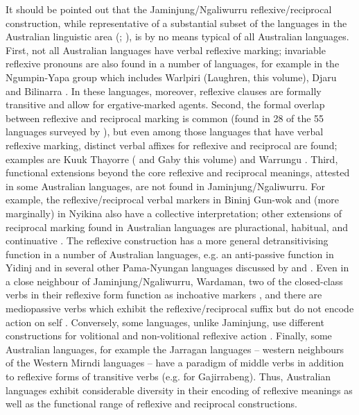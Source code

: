 \documentclass[output=paper,colorlinks,citecolor=brown]{langscibook}
\begin{document}
It should be pointed out that the Jaminjung/Ngaliwurru reflexive/reciprocal construction, while representative of a substantial subset of the languages in the Australian linguistic area (\citealt[320--321]{Dixon2002}; \citealt{Gabyinpress}), is by no means typical of all Australian languages. First, not all Australian languages have verbal reflexive marking; invariable reflexive pronouns are also found in a number of languages, for example in the Ngumpin-Yapa group which includes Warlpiri (Laughren, this volume), Djaru \citep{Tsunoda2007} and Bilinarra \citep[235--238]{MeakinsNordlinger2013}. In these languages, moreover, reflexive clauses are formally transitive and allow for ergative-marked agents. Second, the formal overlap between reflexive and reciprocal marking is common (found in 28 of the 55 languages surveyed by \citealt{Gabyinpress}), but even among those languages that have verbal reflexive marking, distinct verbal affixes for reflexive and reciprocal are found; examples are Kuuk Thayorre (\citealt{Gaby2008} and Gaby this volume) and Warrungu \citep{Tsunoda2007}. Third, functional extensions beyond the core reflexive and reciprocal meanings, attested in some Australian languages, are not found in Jaminjung/Ngaliwurru. For example, the reflexive/reciprocal verbal markers in Bininj Gun-wok \citep[495--497]{Evans2003} and (more marginally) in Nyikina \citep[114]{McGregor2000} also have a collective interpretation; other extensions of reciprocal marking found in Australian languages are pluractional, habitual, and continuative \citep{Gabyinpress}. The reflexive construction has a more general detransitivising function in a number of Australian languages, e.g. an anti-passive function in Yidinj \citep[532]{Dixon2002} and in several other Pama-Nyungan languages discussed by \citet{Terrill1997} and \citet[165--167]{Janic2010}. Even in a close neighbour of Jaminjung/Ngaliwurru, Wardaman, two of the closed-class verbs in their reflexive form function as inchoative markers \citep[208--210]{Merlan1994}, and there are mediopassive verbs which exhibit the reflexive/reciprocal suffix but do not encode action on self \citep[191]{Merlan1994}. Conversely, some languages, unlike Jaminjung, use different constructions for volitional and non-volitional reflexive action \citep{Gabyinpress}. Finally, some Australian languages, for example the Jarragan languages – western neighbours of the Western Mirndi languages – have a paradigm of middle verbs in addition to reflexive forms of transitive verbs (e.g. \citealt[60]{KofodPalmer2007} for Gajirrabeng). Thus, Australian languages exhibit considerable diversity in their encoding of reflexive meanings as well as the functional range of reflexive and reciprocal constructions.
\end{document}
